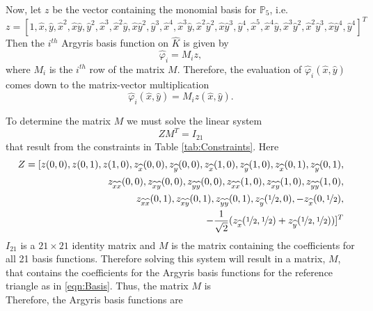 

Now, let $z$ be the vector containing the monomial basis for $\mathbb{P}_5$, i.e.
\small{
\begin{equation*}
  z=\left[
    1, \hat{x}, \hat{y}, \hat{x}^2, \hat{x}\hat{y}, \hat{y}^2, \hat{x}^3, \hat{x}^2\hat{y}, \hat{x}\hat{y}^2, \hat{y}^3, \hat{x}^4, \hat{x}^3\hat{y},
    \hat{x}^2\hat{y}^2, \hat{x}\hat{y}^3, \hat{y}^4, \hat{x}^5, \hat{x}^4\hat{y}, \hat{x}^3\hat{y}^2, \hat{x}^2\hat{y}^3, \hat{x}\hat{y}^4, \hat{y}^4
  \right]^{T}
\end{equation*}}
Then the $i^{th}$ Argyris basis function on $\hat{K}$ is given by
\begin{equation*}
  \hat{\varphi}_i = M_i z,
\end{equation*}
where $M_i$ is the $i^{th}$ row of the matrix $M$. Therefore, the evaluation of
$\hat{\varphi}_i(\hat{x},\hat{y})$ comes down to the matrix-vector multiplication
\begin{equation*}
  \hat{\varphi}_i(\hat{x},\hat{y}) = M_i z(\hat{x},\hat{y}).
\end{equation*}

To determine the matrix $M$ we must solve the linear system
\begin{equation*}
  ZM^T=I_{21}
\end{equation*}
that result from the constraints in Table \ref{tab:Constraints}. Here
\begin{equation*}
  \begin{split}Z=[z(0,0), z(0,1), z(1,0),
  z_{\hat{x}}(0,0), z_{\hat{y}}(0,0),
  z_{\hat{x}}(1,0), z_{\hat{y}}(1,0),
  z_{\hat{x}}(0,1), z_{\hat{y}}(0,1), \\
  z_{\hat{x}\hat{x}}(0,0), z_{\hat{x}\hat{y}}(0,0), z_{\hat{y}\hat{y}}(0,0),
  z_{\hat{x}\hat{x}}(1,0), z_{\hat{x}\hat{y}}(1,0), z_{\hat{y}\hat{y}}(1,0), \\
  z_{\hat{x}\hat{x}}(0,1), z_{\hat{x}\hat{y}}(0,1), z_{\hat{y}\hat{y}}(0,1),
  z_{\hat{y}}(\nicefrac{1}{2},0), -z_{\hat{x}}(0,\nicefrac{1}{2}), \\
  -\frac{1}{\sqrt{2}}(z_{\hat{x}}(\nicefrac{1}{2},\nicefrac{1}{2}) +
  z_{\hat{y}}(\nicefrac{1}{2},\nicefrac{1}{2}))]^T\end{split}
\end{equation*}
$I_{21}$ is a $21\times 21$ identity matrix and $M$ is the matrix containing the
coefficients for all 21 basis functions. Therefore solving this system will
result in a matrix, $M$, that contains the coefficients for the Argyris basis
functions for the reference triangle as in \eqref{eqn:Basis}. Thus, the matrix
$M$ is \\

Therefore, the Argyris basis functions are


